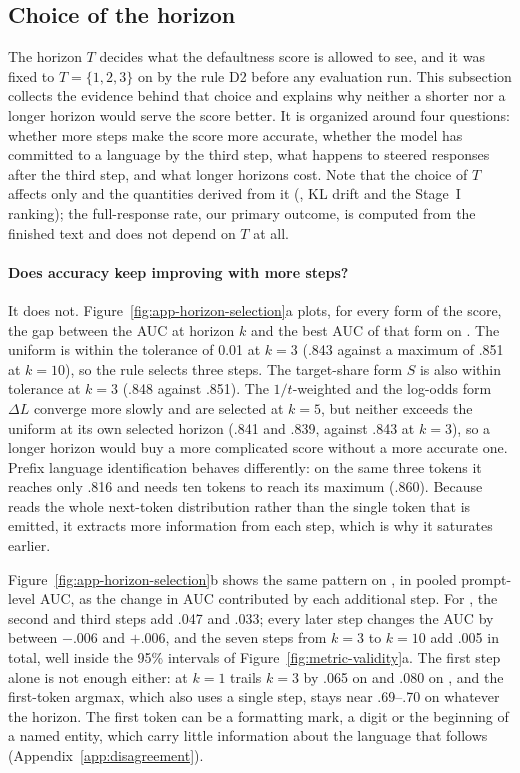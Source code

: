 \FloatBarrier
\subsection{Choice of the horizon}
\label{app:horizon}

The horizon $T$ decides what the defaultness score is allowed to see, and it was fixed to $T=\{1,2,3\}$ on \Ddev by the rule D2 before any evaluation run. This subsection collects the evidence behind that choice and explains why neither a shorter nor a longer horizon would serve the score better. It is organized around four questions: whether more steps make the score more accurate, whether the model has committed to a language by the third step, what happens to steered responses after the third step, and what longer horizons cost. Note that the choice of $T$ affects only \dM and the quantities derived from it (, KL drift and the Stage~I ranking); the full-response rate, our primary outcome, is computed from the finished text and does not depend on $T$ at all.

\paragraph{Does accuracy keep improving with more steps?}
It does not. Figure~\ref{fig:app-horizon-selection}a plots, for every form of the score, the gap between the AUC at horizon $k$ and the best AUC of that form on \Ddev. The uniform \dM is within the tolerance of 0.01 at $k{=}3$ (.843 against a maximum of .851 at $k{=}10$), so the rule selects three steps. The target-share form $S$ is also within tolerance at $k{=}3$ (.848 against .851). The $1/t$-weighted \dM and the log-odds form $\Delta L$ converge more slowly and are selected at $k{=}5$, but neither exceeds the uniform \dM at its own selected horizon (.841 and .839, against .843 at $k{=}3$), so a longer horizon would buy a more complicated score without a more accurate one. Prefix language identification behaves differently: on the same three tokens it reaches only .816 and needs ten tokens to reach its maximum (.860). Because \dM reads the whole next-token distribution rather than the single token that is emitted, it extracts more information from each step, which is why it saturates earlier.

Figure~\ref{fig:app-horizon-selection}b shows the same pattern on \Deval, in pooled prompt-level AUC, as the change in AUC contributed by each additional step. For \dM, the second and third steps add .047 and .033; every later step changes the AUC by between $-.006$ and $+.006$, and the seven steps from $k{=}3$ to $k{=}10$ add .005 in total, well inside the 95\% intervals of Figure~\ref{fig:metric-validity}a. The first step alone is not enough either: \dM at $k{=}1$ trails $k{=}3$ by .065 on \Ddev and .080 on \Deval, and the first-token argmax, which also uses a single step, stays near .69--.70 on \Deval whatever the horizon. The first token can be a formatting mark, a digit or the beginning of a named entity, which carry little information about the language that follows (Appendix~\ref{app:disagreement}).

